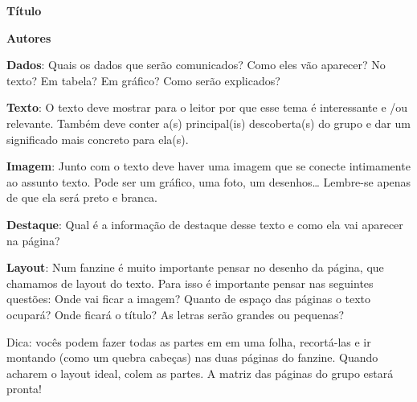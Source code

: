 \textbf{Título}

\textbf{Autores}

\textbf{Dados}: Quais os dados que serão comunicados? Como eles vão aparecer? No texto? Em tabela? Em gráfico? Como serão explicados?

\textbf{Texto}: O texto deve mostrar para o leitor por que esse tema é interessante e /ou relevante. Também deve conter a(s) principal(is) descoberta(s) do grupo e dar um significado mais concreto para ela(s).

\textbf{Imagem}: Junto com o texto deve haver uma imagem que se conecte intimamente ao assunto texto. Pode ser um gráfico, uma foto, um desenhos… Lembre-se apenas de que ela será preto e branca.

\textbf{Destaque}:
Qual é a informação de destaque desse texto e como ela vai aparecer na página?

\textbf{Layout}:
Num fanzine é muito importante pensar no desenho da página, que chamamos de layout do texto. Para isso é importante pensar nas seguintes questões: Onde vai ficar a imagem? Quanto de espaço das páginas o texto ocupará? Onde ficará o título? As letras serão grandes ou pequenas?


Dica: vocês podem fazer todas as partes em em uma folha,  recortá-las e ir montando (como um quebra cabeças) nas duas páginas do fanzine. Quando acharem o layout ideal, colem as partes. A matriz das páginas do grupo  estará pronta!

\fi
